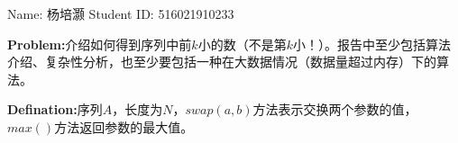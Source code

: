 \documentclass[12pt,a4paper]{article}
\theoremstyle{definition}
\begin{document}
\noindent

\noindent{}
\begin{center}
\footnotesize{\color{black} Name: 杨培灏  \quad Student ID: 516021910233}
\end{center}

\textbf{Problem:}介绍如何得到序列中前$k$小的数（不是第$k$小！）。报告中至少包括算法介绍、复杂性分析，也至少要包括一种在大数据情况（数据量超过内存）下的算法。

\textbf{Defination:}序列$A$，长度为$N$，$swap(a,b)$方法表示交换两个参数的值，$max()$方法返回参数的最大值。
\end{document}
